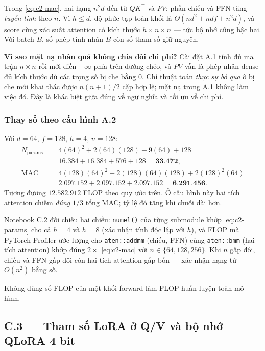 Trong \eqref{eq:c2-mac}, hai hạng $n^2d$ đến từ $QK^\top$ và $PV$; phần chiếu và
FFN tăng \emph{tuyến tính} theo $n$. Vì $h\le d$, độ phức tạp toàn khối là
$\Theta(nd^2+ndf+n^2d)$, và score cùng xác suất attention có kích thước
$h\times n\times n$ --- tức bộ nhớ cũng bậc hai. Với batch $B$, số phép tính nhân
$B$ còn số tham số giữ nguyên.

\textbf{Vì sao mặt nạ nhân quả không chia đôi chi phí?} Cài đặt A.1 tính đủ ma trận
$n\times n$ rồi mới điền $-\infty$ phía trên đường chéo, và $PV$ vẫn là phép nhân
dense đủ kích thước dù các trọng số bị che bằng $0$. Chỉ thuật toán \emph{thực sự
bỏ qua} ô bị che mới khai thác được $n(n+1)/2$ cặp hợp lệ; mặt nạ trong A.1 không
làm việc đó. Đây là khác biệt giữa đúng về ngữ nghĩa và tối ưu về chi phí.

\subsubsection{Thay số theo cấu hình A.2 \dalam}

Với $d=64$, $f=128$, $h=4$, $n=128$:
\begin{align*}
  N_{\mathrm{params}}&=4(64)^2+2(64)(128)+9(64)+128\\
   &=16{.}384+16{.}384+576+128=\mathbf{33{.}472},\\
  \mathrm{MAC}&=4(128)(64)^2+2(128)(64)(128)+2(128)^2(64)\\
   &=2{.}097{.}152+2{.}097{.}152+2{.}097{.}152=\mathbf{6{.}291{.}456}.
\end{align*}
Tương đương $12{.}582{.}912$ FLOP theo quy ước trên. Ở cấu hình này hai tích
attention chiếm \emph{đúng} $1/3$ tổng MAC; tỷ lệ đó tăng khi chuỗi dài hơn.

Notebook C.2 đối chiếu hai chiều: \texttt{numel()} của từng submodule khớp
\eqref{eq:c2-params} cho cả $h=4$ và $h=8$ (xác nhận tính độc lập với $h$), và FLOP
mà PyTorch Profiler ước lượng cho \texttt{aten::addmm} (chiếu, FFN) cùng
\texttt{aten::bmm} (hai tích attention) khớp đúng $2\times$ \eqref{eq:c2-mac} với
$n\in\{64,128,256\}$. Khi $n$ gấp đôi, chiếu và FFN gấp đôi còn hai tích attention
gấp bốn --- xác nhận hạng tử $O(n^2)$ bằng số.

Không dùng số FLOP của một khối forward làm FLOP huấn luyện toàn mô hình.

\subsection{C.3 --- Tham số LoRA ở Q/V và bộ nhớ QLoRA 4 bit}
\label{sec:c3}

